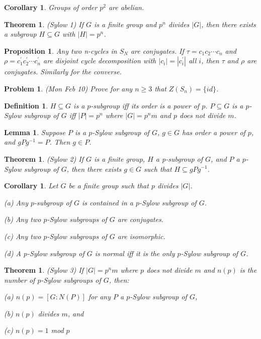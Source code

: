 \documentclass[12pt]{article}
\def\pr{^\prime}
\def\su{\subseteq}
\newtheorem{thm}[theorem]{Theorem}
\newtheorem{lemma}[theorem]{Lemma}
\newtheorem{define}[theorem]{Definition}
\newtheorem{prop}[theorem]{Proposition}
\newtheorem{cor}[theorem]{Corollary}
\newtheorem{prob}{Problem}
\begin{document}
\begin{cor}
Groups of order $p^2$ are abelian.
\end{cor}

\begin{thm}
(Sylow 1) If $G$ is a finite group and $p^n$ divides $|G|$,
then there exists a subgroup $H\su G$ with $|H|=p^n$.
\end{thm}

\begin{prop}
Any two n-cycles in $S_N$ are conjugates.  If $\tau=c_1c_2\cdots c_n$
and $\rho=c_1\pr c_2\pr \cdots c_n\pr$ are
disjoint cycle decomposition with $|c_i|=|c_i\pr|$ all $i$, then
$\tau$ and $\rho$ are conjugates.  Similarly for the converse.
\end{prop}

\begin{prob}
(Mon Feb 10) Prove for any $n\geq 3$ that
$Z(S_n)=\{id\}$.
\end{prob}

\begin{define}
$H\su G$ is a $p$-subgroup iff its order is a power of $p$. $P\su G$
is a $p$-Sylow subgroup of $G$ iff $|P|=p^n$ where $|G|=p^nm$ and
$p$ does not divide $m$.
\end{define}

\begin{lemma}
Suppose $P$ is a $p$-Sylow subgroup of $G$, $g\in G$ has
order a power of $p$, and $gPg^{-1}=P$.  Then $g\in P$.
\end{lemma}

\begin{thm}
(Sylow 2) If $G$ is a finite group, $H$ a p-subgroup of $G$, and $P$
a $p$-Sylow subgroup of $G$, then there exists $g\in G$ such that
$H\su gPg^{-1}$.
\end{thm}

\begin{cor} Let $G$ be a finite group such that $p$ divides $|G|$.
\par (a) Any $p$-subgroup of $G$ is contained in a $p$-Sylow subgroup of $G$.
\par (b) Any two $p$-Sylow subgroups of $G$ are conjugates.
\par (c) Any two $p$-Sylow subgroups of $G$ are isomorphic.
\par (d) A $p$-Sylow subgroup of $G$ is normal iff it is the only
$p$-Sylow subgroup of $G$.
\end{cor}

\begin{thm}
(Sylow 3) If $|G|=p^nm$ where $p$ does not divide $m$ and
$n(p)$ is the number of $p$-Sylow subgroups of $G$, then:
\par (a) $n(p)=[G:N(P)]$ for any $P$ a $p$-Sylow subgroup of $G$,
\par (b) $n(p)$ divides $m$, and
\par (c) $n(p)=1$ mod $p$
\end{thm}
\end{document}
